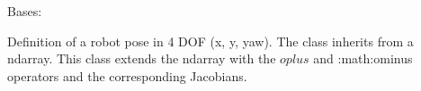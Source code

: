 \documentclass[letterpaper,10pt,english]{sphinxmanual}
\begin{document}
\begin{fulllineitems}
\label{\detokenize{Pose:Pose.Pose4D}}
\pysigstartsignatures
{}
\pysigstopsignatures
\sphinxAtStartPar
Bases: {\hyperref[\detokenize{Pose:Pose.Pose}]{}}

\sphinxAtStartPar
Definition of a robot pose in 4 DOF (x, y, yaw). The class inherits from a ndarray.
This class extends the ndarray with the \(oplus\) and :math:{\color{red}\bfseries{}\textasciigrave{}}ominus operators and the corresponding Jacobians.

\begin{fulllineitems}
\label{\detokenize{Pose:Pose.Pose4D.__init__}}
\pysigstartsignatures
{}
\pysigstopsignatures
\end{fulllineitems}



\end{fulllineitems}
\end{document}
